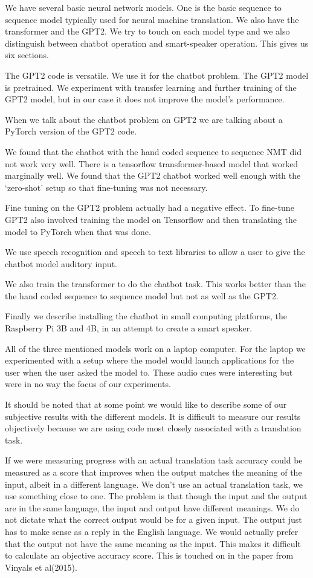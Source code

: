 We have several basic neural network models. One is the basic sequence to sequence model typically used for neural machine translation. We also have the transformer and the GPT2. We try to touch on each model type and we also distinguish between chatbot operation and smart-speaker operation. This gives us six sections.

The GPT2 code is versatile. We use it for the chatbot problem. The GPT2 model is pretrained. We experiment with transfer learning and further training of the GPT2 model, but in our case it does not improve the model's performance. 

When we talk about the chatbot problem on GPT2 we are talking about a PyTorch version of the GPT2 code. 

We found that the chatbot with the hand coded sequence to sequence NMT did not work very well. There is a tensorflow transformer-based model that worked marginally well. We found that the GPT2 chatbot worked well enough with the `zero-shot' setup so that fine-tuning was not necessary. 

Fine tuning on the GPT2 problem actually had a negative effect. To fine-tune GPT2 also involved training the model on Tensorflow and then translating the model to PyTorch when that was done. 

We use speech recognition and speech to text libraries to allow a user to give the chatbot model auditory input.

We also train the transformer to do the chatbot task. This works better than the the hand coded sequence to sequence model but not as well as the GPT2.

Finally we describe installing the chatbot in small computing platforms, the Raspberry Pi 3B and 4B, in an attempt to create a smart speaker.

All of the three mentioned models work on a laptop computer. For the laptop we experimented with a setup where the model would launch applications for the user when the user asked the model to. These audio cues were interesting but were in no way the focus of our experiments.

It should be noted that at some point we would like to describe some of our subjective results with the different models. It is difficult to measure our results objectively because we are using code most closely associated with a translation task. 

If we were measuring progress with an actual translation task accuracy could be measured as a score that improves when the output matches the meaning of the input, albeit in a different language. We don't use an actual translation task, we use something close to one. The problem is that though the input and the output are in the same language, the input and output have different meanings. We do not dictate what the correct output would be for a given input. The output just has to make sense as a reply in the English language. We would actually prefer that the output not have the same meaning as the input. This makes it difficult to calculate an objective accuracy score. This is touched on in the paper from Vinyals et al(2015)\cite{DBLP:journals/corr/VinyalsL15}.

